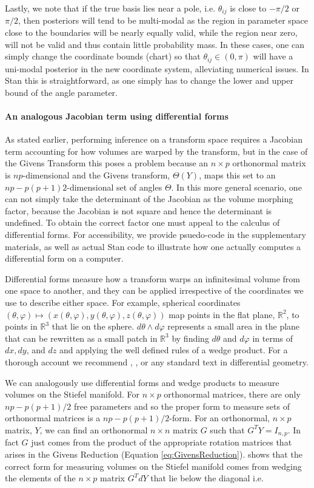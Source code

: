 \documentclass{article}
\begin{document}
Lastly, we note that if the true basis lies near a pole, i.e. $\theta_{ij}$ is close to $-\pi/2$ or $\pi/2$, then posteriors will tend to be multi-modal as the region in parameter space close to the boundaries will be nearly equally valid, while the region near zero, will not be valid and thus contain little probability mass. In these cases, one can simply change the coordinate bounds (chart) so that $\theta_{ij} \in (0, \pi)$ will have a uni-modal posterior in the new coordinate system, alleviating numerical issues. In Stan this is straightforward, as one simply has to change the lower and upper bound of the angle parameter.

\paragraph{An analogous Jacobian term using differential forms} As stated earlier, performing inference on a transform space requires a Jacobian term accounting for how volumes are warped by the transform, but in the case of the Givens Transform this poses a problem because an $n \times p$ orthonormal matrix is $np$-dimensional and the Givens transform, $\Theta(Y)$, maps this set to an $np - p(p+1)2$-dimensional set of angles $\Theta$. In this more general scenario, one can not simply take the determinant of the Jacobian as the volume morphing factor, because the Jacobian is not square and hence the determinant is undefined. To obtain the correct factor one must appeal to the calculus of differential forms. For accessibility, we provide psuedo-code in the supplementary materials, as well as actual Stan code to illustrate how one actually computes a differential form on a computer.

Differential forms measure how a transform warps an infinitesimal volume from one space to another, and they can be applied irrespective of the coordinates we use to describe either space. For example, spherical coordinates $(\theta, \varphi) \mapsto (x(\theta,\varphi), y(\theta,\varphi), z(\theta,\varphi))$ map points in the flat plane, $\mathbb{R}^2$, to points in $\mathbb{R}^3$ that lie on the sphere. $d\theta \wedge d\varphi$ represents a small area in the plane that can be rewritten as a small patch in $\mathbb{R}^3$ by finding $d\theta$ and $d\varphi$ in terms of $dx, dy$, and $dz$ and applying the well defined rules of a wedge product. For a thorough account we recommend \citet{muirhead2009aspects}, \citet{edelman200518}, or any standard text in differential geometry.

We can analogously use differential forms and wedge products to measure volumes on the Stiefel manifold. For $n \times p$ orthonormal matrices, there are only $np-p(p+1)/2$ free parameters and so the proper form to measure sets of orthonormal matrices is a $np-p(p+1)/2$-form. For an orthonormal, $n \times p$ matrix, $Y$, we can find an orthonormal $n \times n$ matrix $G$ such that $G^T Y = I_{n,p}$. In fact $G$ just comes from the product of the appropriate rotation matrices that arises in the Givens Reduction (Equation \ref{eq:GivensReduction}). \citet{muirhead2009aspects} shows that the correct form for measuring volumes on the Stiefel manifold comes from wedging the elements of the $n \times p$ matrix $G^T dY$ that lie below the diagonal i.e.
\end{document}
